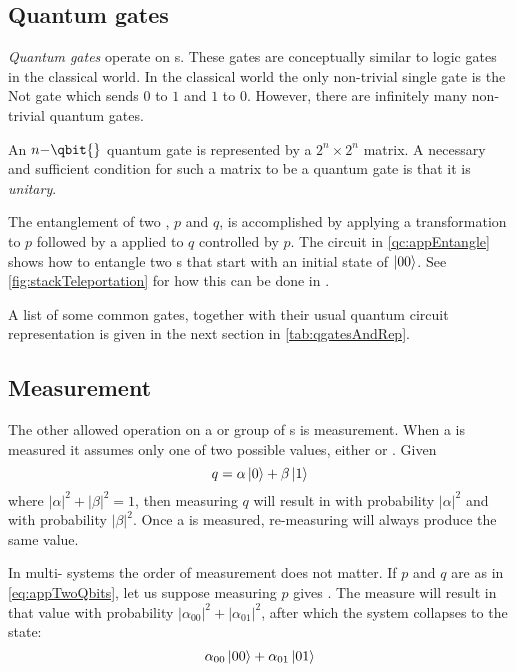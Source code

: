 \subsection{Quantum gates}\label{sec:appQuantumGates}
\emph{Quantum gates} operate on \qbit{}s. These 
gates are conceptually similar to logic gates in the classical world.
 In the
classical world the only non-trivial single 
\bit{} gate is the Not gate which 
sends $0$ to $1$ and $1$ to $0$. However, there are 
infinitely many non-trivial quantum
gates.

An $n{-}\qbit{}$ quantum gate is represented by 
a $2^n \times 2^n$ matrix. A 
necessary and sufficient condition for such a matrix to be
a quantum gate is that it is \emph{unitary}. 

The entanglement of two \qbits{}, $p$ and $q$, is accomplished by applying a
\Had{} transformation to $p$ followed by
a \nottr{} applied to $q$ controlled by $p$.
The circuit in
\vref{qc:appEntangle} shows how to entangle two \qbit{}s that start with
an initial state of $\left\vert{00}\right\rangle$. See
\vref{fig:stackTeleportation} for how this can be done in \lqpl.

A list of some common gates, together with their usual
quantum circuit representation is given in the next section in
 \vref{tab:qgatesAndRep}.

\subsection{Measurement}\label{sec:appMeasurement}
The  other allowed
operation on a \qbit{} or group of \qbit{}s is 
measurement. When a  \qbit{} is measured it
assumes only one of two possible values, either  or . Given
\begin{equation}
q=\alpha\left\vert{0}\right\rangle+\beta\left\vert{1}\right\rangle\label{eq:appSingleQbit}
\end{equation}
where $|\alpha|^2+|\beta|^2 = 1$, then measuring $q$ will result in
 with probability $|\alpha|^2$ and  with 
probability $|\beta|^2$.
Once a \qbit{} is measured, re-measuring will always produce the same
value. 

In multi-\qbit{} systems the order of measurement does not matter. 
If $p$ and $q$ are as in \vref{eq:appTwoQbits}, let us suppose measuring $p$
gives  . The measure will result in  that value with probability 
$|\alpha_{00}|^2 + |\alpha_{01}|^2$, after which the system 
collapses to the state:
\begin{equation}
\alpha_{00}\left\vert{00}\right\rangle + \alpha_{01}\left\vert{01}\right\rangle\label{eq:appCollapsedFirstBit}
\end{equation}

